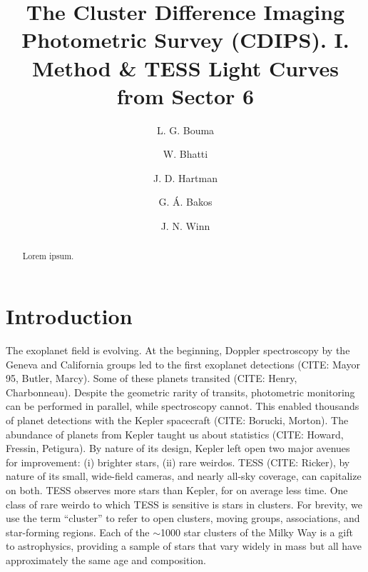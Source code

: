 \documentclass[12pt,twocolumn,tighten]{aastex62}
\begin{document}
\title{
  The Cluster Difference Imaging Photometric Survey (CDIPS).
  I. Method \& TESS Light Curves from Sector 6
}


\author[0000-0002-0514-5538]{L. G. Bouma}
%
\author[0000-0002-0628-0088]{W. Bhatti}
%
\author[0000-0001-8732-6166]{J. D. Hartman}
%
\author[0000-0001-7204-6727]{G. \'A. Bakos}
%
\author[0000-0002-4265-047X]{J. N. Winn}

\begin{abstract}
  Lorem ipsum.
\end{abstract}



\section{Introduction}
\label{sec:intro}

The exoplanet field is evolving.
At the beginning, Doppler spectroscopy by the Geneva and California groups
led to the first exoplanet detections (CITE: Mayor 95, Butler, Marcy).
Some of these planets transited (CITE: Henry, Charbonneau).
Despite the geometric rarity of transits, photometric monitoring can
be performed in parallel, while spectroscopy cannot.
This enabled thousands of planet detections with the Kepler spacecraft
(CITE: Borucki, Morton).
The abundance of planets from Kepler taught us about statistics
(CITE: Howard, Fressin, Petigura).
By nature of its design, Kepler left open two major avenues for
improvement: (i) brighter stars, (ii) rare weirdos.
TESS (CITE: Ricker), by nature of its small, wide-field cameras, and
nearly all-sky coverage, can capitalize on both.
TESS observes more stars than Kepler, for on average less time.
One class of rare weirdo to which TESS is sensitive is stars in
clusters.  For brevity, we use the term ``cluster'' to refer to open
clusters, moving groups, associations, and star-forming regions.
Each of the $\sim$1000 star clusters of the Milky Way is a gift to
astrophysics, providing a sample of stars that vary widely in mass
but all have approximately the same age and composition. 
\end{document}
